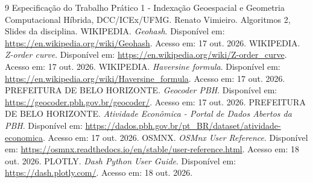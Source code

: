 \documentclass[12pt,a4paper]{article}
\begin{document}
\begin{thebibliography}{9}
  Especificação do Trabalho Prático 1 - Indexação Geoespacial e Geometria Computacional Híbrida, DCC/ICEx/UFMG.
  Renato Vimieiro. Algoritmos 2, Slides da disciplina.
  WIKIPEDIA. \textit{Geohash}. Disponível em: \url{https://en.wikipedia.org/wiki/Geohash}. Acesso em: 17 out. 2026.
  WIKIPEDIA. \textit{Z-order curve}. Disponível em: \url{https://en.wikipedia.org/wiki/Z-order_curve}. Acesso em: 17 out. 2026.
  WIKIPEDIA. \textit{Haversine formula}. Disponível em: \url{https://en.wikipedia.org/wiki/Haversine_formula}. Acesso em: 17 out. 2026. PREFEITURA DE BELO HORIZONTE. \textit{Geocoder PBH}. Disponível em: \url{https://geocoder.pbh.gov.br/geocoder/}. Acesso em: 17 out. 2026.
  PREFEITURA DE BELO HORIZONTE. \textit{Atividade Econômica - Portal de Dados Abertos da PBH}. Disponível em: \url{https://dados.pbh.gov.br/pt_BR/dataset/atividade-economica}. Acesso em: 17 out. 2026.
  OSMNX. \textit{OSMnx User Reference}. Disponível em: \url{https://osmnx.readthedocs.io/en/stable/user-reference.html}. Acesso em: 18 out. 2026.
  PLOTLY. \textit{Dash Python User Guide}. Disponível em: \url{https://dash.plotly.com/}. Acesso em: 18 out. 2026.
\end{thebibliography}
\newpage
\end{document}
